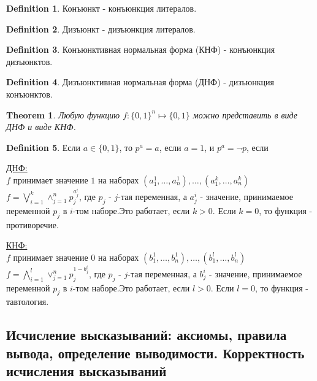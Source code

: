 \documentclass[a4paper]{article}
\theoremstyle{plain}
\newtheorem{theorem}{Theorem}
\theoremstyle{remark}
\theoremstyle{definition}
\newtheorem{definition}{Definition}
\begin{document}
\begin{definition}
	Конъюнкт - конъюнкция литералов.
\end{definition}

\begin{definition}
	Дизъюнкт - дизъюнкция литералов.
\end{definition}

\begin{definition}
	Конъюнктивная нормальная форма (КНФ) - конъюнкция дизъюнктов.
\end{definition}

\begin{definition} 
	Дизъюнктивная нормальная форма (ДНФ) - дизъюнкция конъюнктов.
\end{definition}

\begin{theorem}
	Любую функцию $f: \{0,1\}^n \mapsto \{0,1\}$ можно представить в виде ДНФ и виде КНФ.
\end{theorem}

\begin{definition} %
	Если $a \in \{0,1\}$, то $p^a = a$, если $a = 1$, и $p^a = \lnot p$, если 
\end{definition}

\underline{ДНФ:} \\
	$f$ принимает значение $1$ на наборах $(a_1^1, \ldots, a_n^1), \ldots, (a_1^k, \ldots, a_n^k)$\\
	$f = \bigvee_{i=1}^k \land_{j=1}^{n} p_j^{a_j^i}$, где $p_j$ - $j$-тая переменная, а $a_j^i$ - значение, принимаемое переменной $p_j$ в $i$-том наборе.Это работает, если $k > 0$. Если $k = 0$, то функция - противоречие.

\underline{КНФ:} \\
	$f$ принимает значение $0$ на наборах $(b_1^1, \ldots, b_n^1), \ldots, (b_1^l, \ldots, b_n^l)$\\
	$f = \bigwedge_{i=1}^l \lor_{j=1}^{n} p_j^{1 - b_j^i}$, где $p_j$ - $j$-тая переменная, а $b_j^i$ - значение, принимаемое переменной $p_j$ в $i$-том наборе.Это работает, если $l > 0$. Если $l = 0$, то функция - тавтология.
\subsection{Исчисление высказываний: аксиомы, правила вывода, определение выводимости. Корректность исчисления высказываний}
\end{document}
